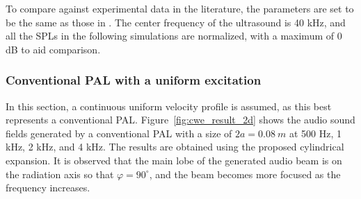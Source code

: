 To compare against experimental data in the literature, the parameters are set to be the same as those in \cite{Shi2015ConvolutionModelComputing}. 
The center frequency of the ultrasound is 40 kHz, and all the SPLs in the following simulations are normalized, with a maximum of 0 dB to aid comparison.

\subsubsection{Conventional PAL with a uniform excitation}
In this section, a continuous uniform velocity profile is assumed, as this best represents a conventional PAL. 
Figure~\ref{fig:cwe_result_2d} shows the audio sound fields generated by a conventional PAL with a size of $2a = \SI{0.08}{m}$ at 500 Hz, 1 kHz, 2 kHz, and 4 kHz. 
The results are obtained using the proposed cylindrical expansion. 
It is observed that the main lobe of the generated audio beam is on the radiation axis so that $\varphi = 90^\circ$, and the beam becomes more focused as the frequency increases. 


